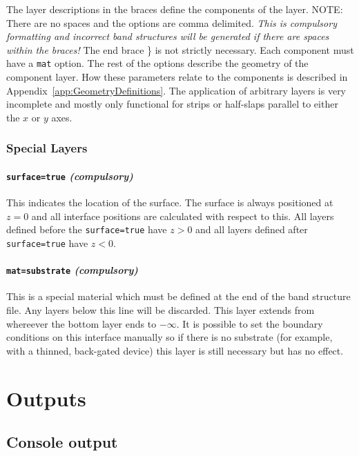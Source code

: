 \documentclass[12pt]{article}
\begin{document}
\vspace{0.5cm}

The layer descriptions in the braces define the components of the layer.  {\color{red} NOTE:}
There are no spaces and the options are comma delimited. \emph{This is compulsory formatting
and incorrect band structures will be generated if there are spaces within the braces!}  The
end brace \} is not strictly necessary.  Each component must have a \texttt{mat} option.  The
rest of the options describe the geometry of the component layer.  How these parameters
relate to the components is described in Appendix~\ref{app:GeometryDefinitions}.  The
application of arbitrary layers is very incomplete and mostly only functional for strips
or half-slaps parallel to either the $x$ or $y$ axes.

\subsubsection{Special Layers}
\label{subsubsec:SpecialLayers}

\paragraph{\texttt{surface=true} \emph{(compulsory)}}
This indicates the location of the surface.  The surface is always positioned at $z = 0$ and
all interface positions are calculated with respect to this.  All layers defined before the
\texttt{surface=true} have $z > 0$ and all layers defined after \texttt{surface=true} have
$z < 0$.

\paragraph{\texttt{mat=substrate} \emph{(compulsory)}}
This is a special material which must be defined at the end of the band structure file.  Any
layers below this line will be discarded.  This layer extends from whereever the bottom layer
ends to $-\infty$.  It is possible to set the boundary conditions on this interface manually
so if there is no substrate (for example, with a thinned, back-gated device) this layer is
still necessary but has no effect.


\section{Outputs}

\subsection{Console output}
\label{subsec:ConsoleOutput}
\end{document}
